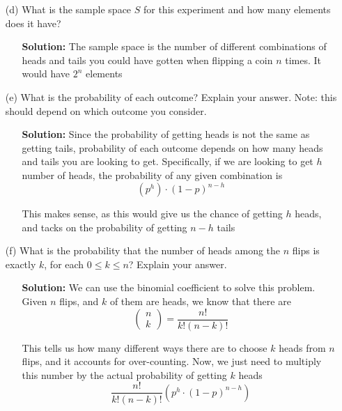 \documentclass[hidelinks]{article}
\begin{document}
\begin{itemize}
    \item[(d)] What is the sample space $S$ for this experiment and how many elements does it have?
    \begin{itemize}
        \item[] \textbf{Solution:} The sample space is the number of different combinations of heads and tails you could have gotten when flipping a coin $n$ times. It would have $2^n$ elements
    \end{itemize}
    \item[(e)] What is the probability of each outcome? Explain your answer. Note: this should depend on which outcome you consider.
    \begin{itemize}
        \item[] \textbf{Solution:} Since the probability of getting heads is not the same as getting tails, probability of each outcome depends on how many heads and tails you are looking to get. Specifically, if we are looking to get $h$ number of heads, the probability of any given combination is 
        \[
            (p^h) \cdot (1 - p)^{n - h} 
        \]
        \item[ ] This makes sense, as this would give us the chance of getting $h$ heads, and tacks on the probability of getting $n - h$ tails
    \end{itemize}
    \item[(f)] What is the probability that the number of heads among the $n$ flips is exactly $k$, for each $0 \leq k \leq n$? Explain your answer.
    \begin{itemize}
        \item[] \textbf{Solution:} We can use the binomial coefficient to solve this problem. Given $n$ flips, and $k$ of them are heads, we know that there are 
            \[
            \begin{pmatrix}n \\ k \end{pmatrix}  = \frac{n!}{k!(n-k)!}
            \]
        \item[ ] This tells us how many different ways there are to choose $k$ heads from $n$ flips, and it accounts for over-counting. Now, we just need to multiply this number by the actual probability of getting $k$ heads 
            \[
                \frac{n!}{k!(n-k)!}(p^h \cdot  (1-p)^{n-h})
            \]
    \end{itemize}
\end{itemize}
\newpage
\end{document}

